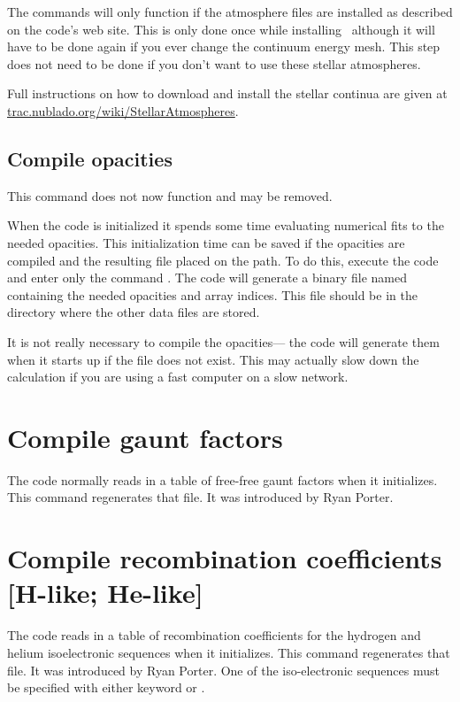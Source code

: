 The  commands will only function
if the atmosphere files
are installed as described on the code's web site.
This is only done once
while installing \Cloudy\ although it will have to be
done again if you ever
change the continuum energy mesh.
This step does not need to be done if
you don't want to use these stellar atmospheres.

Full instructions on how to download and install the stellar continua
are given at
\href{http://trac.nublado.org/wiki/StellarAtmospheres}{trac.nublado.org/wiki/StellarAtmospheres}.

\begin{shaded}
\section{Compile opacities}

 This command does not now function and may be removed.

When the code is initialized it spends some time evaluating numerical
fits to the needed opacities.
This initialization time can be saved if
the opacities are compiled and the resulting file placed on the path.
To
do this, execute the code and enter only the command
.
The code will generate a binary file named 
containing the needed opacities and array indices.
This file should be in the directory where
the other data files are stored.

  It is not really necessary to compile the opacities---
the code
will generate them when it starts up if the file does not exist.
This may
actually slow down the calculation if you are using a fast computer on a
slow network.
\end{shaded}

\section{Compile gaunt factors}

The code normally reads in a table of free-free gaunt factors when it
initializes.
This command regenerates that file.
It was introduced by Ryan Porter.

\section{Compile recombination coefficients [H-like; He-like]}

The code reads in a table of recombination coefficients for the hydrogen and
helium isoelectronic sequences when it initializes.
This command regenerates that file.
It was
introduced by Ryan Porter.
One of the iso-electronic sequences must be
specified with either keyword  or .

